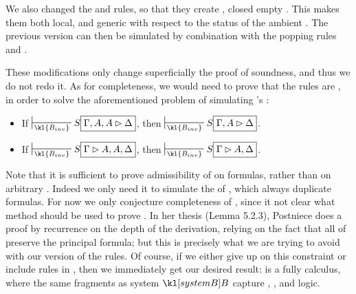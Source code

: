 \begin{remark}
  We also changed the \rsf{\bot{-}} and \rsf{\top{+}} rules, so that they create
  , closed empty . This makes them both local, and generic
  with respect to the status of the ambient . The previous version can
  then be simulated by combination with the popping rules  and
  .
\end{remark}

These modifications only change superficially the proof of soundness, and thus
we do not redo it. As for completeness, we would need to prove that the
 rules are , in order to solve the aforementioned problem
of simulating 's :

\begin{lemma}
  \sbr
  \begin{itemize}
    \item If $\prov{\kl{B_{inv}}} S\select{\Gamma, A, A \J \Delta}$, then
          $\prov{\kl{B_{inv}}} S\select{\Gamma, A \J \Delta}$.
    \item If $\prov{\kl{B_{inv}}} S\select{\Gamma \J A, A, \Delta}$, then
          $\prov{\kl{B_{inv}}} S\select{\Gamma \J A, \Delta}$.
  \end{itemize}
\end{lemma}

Note that it is sufficient to prove admissibility of  on
formulas, rather than on arbitrary . Indeed we only need it to simulate the
 of , which always duplicate formulas. For now
we only conjecture completeness of , since it not clear what method
should be used to prove . In her thesis
\cite{postniece_proof_2010} (Lemma 5.2.3), Postniece does a proof by recurrence
on the depth of the derivation, relying on the fact that all  of  preserve the principal formula; but this is precisely what
we are trying to avoid with our version of the rules. Of course, if we either
give up on this constraint or include  rules in , then we
immediately get our desired result:  is a fully  calculus,
where the same fragments as system $\sysB$ capture ,
,  and  logic.

